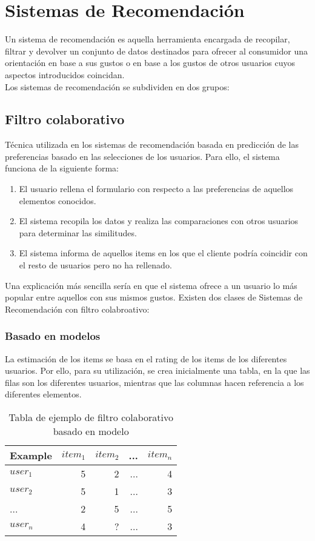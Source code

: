 \section{Sistemas de Recomendación}
Un sistema de recomendación es aquella herramienta encargada de recopilar, filtrar y devolver un conjunto de datos destinados para ofrecer al consumidor una orientación en base a sus gustos o en base a los gustos de otros usuarios cuyos aspectos introducidos coincidan.\nocite{wiki:recomendacion} \\
Los sistemas de recomendación se subdividen en dos grupos: 
\subsection{Filtro colaborativo}
Técnica utilizada en los sistemas de recomendación basada en predicción de las preferencias basado en las selecciones de los usuarios. Para ello, el sistema funciona de la siguiente forma: \nocite{andres_gonzalez_sistemas_2014}
\begin{enumerate}
\item El usuario rellena el formulario con respecto a las preferencias de aquellos elementos conocidos.
\item El sistema recopila los datos y realiza las comparaciones con otros usuarios para determinar las similitudes. \nocite{upf:recomendacion}
\item El sistema informa de aquellos items en los que el cliente podría coincidir con el resto de usuarios pero no ha rellenado. \cite{wiki:filtrado}
\end{enumerate}
Una explicación más sencilla sería en que el sistema ofrece a un usuario lo más popular entre aquellos con sus mismos gustos.\nocite{ucm:recomendacion} 
Existen dos clases de Sistemas de Recomendación con filtro colabroativo: 
\subsubsection{Basado en modelos}
La estimación de los items se basa en el rating de los items de los diferentes usuarios. 
Por ello, para su utilización, se crea inicialmente una tabla, en la que las filas son los diferentes usuarios, mientras que las columnas hacen referencia a los diferentes elementos.

\begin{table}[]
\centering
\caption{Tabla de ejemplo de filtro colaborativo basado en modelo}
\label{tab:1}
\begin{tabular}{ lrrrr }
\toprule
Example                & $item_{1}$ & $item_{2}$ & ... & $item_{n}$ \\ \midrule
$user_{1}$ & 5         & 2           & ...           & 4       \\ 
$user_{2}$ & 5         & 1            & ...           & 3       \\ 
... & 2        & 5           & ...           & 5       \\ 
$user_{n}$ & 4         & ?           & ...          & 3       \\ \bottomrule
\end{tabular}
\end{table}

